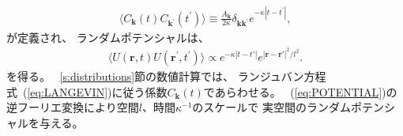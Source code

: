 \documentclass[12pt,a4paper]{jbook}
\begin{document}
			\begin{eqnarray}
				\langle
					C_{\bm k}(t)
					C_{{\bm k}^\prime}(t^\prime)
				\rangle
				\equiv \frac{A_{\bm k}}{2 \kappa} \delta_{{\bm k}{\bm k}^\prime} e^{-\kappa|t-t^\prime|},
			\end{eqnarray}
            が定義され、
            ランダムポテンシャルは、
			\begin{eqnarray}
				\langle
					U({\bm r}, t) U({\bm r}^\prime, t^\prime)
				\rangle \propto
				e^{-\kappa |t-t'|} e^{|\bm{r}-\bm{r}'|^2/l^2}.
			\end{eqnarray}
            を得る。
			~\ref{s:distributions}節の数値計算では、
            ランジュバン方程式~(\ref{eq:LANGEVIN})に従う係数$C_{\bm k}(t)$であらわせる。
            ~(\ref{eq:POTENTIAL})の逆フーリエ変換により空間$l$、時間$\kappa^{-1}$のスケールで
            実空間のランダムポテンシャルを与える。
\end{document}
